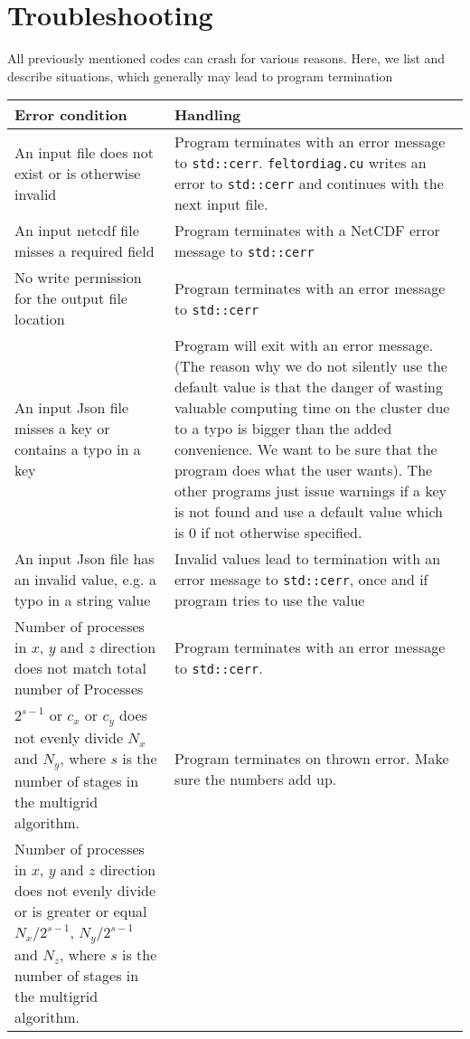 \section{Troubleshooting} \label{sec:troubleshooting}
All previously mentioned codes can crash for various reasons. Here,
we list and describe situations, which generally may lead to program
termination
\begin{longtable}{p{6cm}p{8cm}}
\toprule
\rowcolor{gray!50}\textbf{Error condition} &  \textbf{Handling} \\ \midrule
An input file does not exist or is otherwise invalid
&
Program terminates with an error message to \texttt{std::cerr}. \texttt{feltordiag.cu} writes an error to \texttt{std::cerr} and continues with the next input file.
    \\
An input netcdf file misses a required field
&
Program terminates with a NetCDF error message to \texttt{std::cerr}
    \\
No write permission for the output file location
&
Program terminates with an error message to \texttt{std::cerr}
    \\
An input Json file misses a key or contains a typo in a key
&
Program will exit with an error message. (The reason why we do not
silently use the default value is that the danger of wasting
valuable computing time on the cluster due to a typo is bigger than the
added convenience. We want to be sure that the program
does what the user wants).
The other programs just issue warnings
if a key is not found and use a default value
which is $0$ if not otherwise specified.
    \\
    An input Json file has an invalid value, e.g. a typo in a string value
&
Invalid values lead to termination with an error message to \texttt{std::cerr}, once and if program tries to use the value
    \\
    Number of processes in $x$, $y$ and $z$ direction does not match total number of Processes
&
Program terminates with an error message to \texttt{std::cerr}.
    \\
    $2^{s-1}$ or $c_x$ or $c_y$ does not evenly divide $N_x$ and $N_y$, where $s$ is the number of stages in the multigrid algorithm.
&
Program terminates on thrown error. Make sure the numbers add up.
    \\
    Number of processes in $x$, $y$ and $z$ direction does not evenly divide or is greater or equal $N_x/2^{s-1}$, $N_y/2^{s-1}$ and $N_z$, where $s$ is the number of stages in the multigrid algorithm.

\end{longtable}
